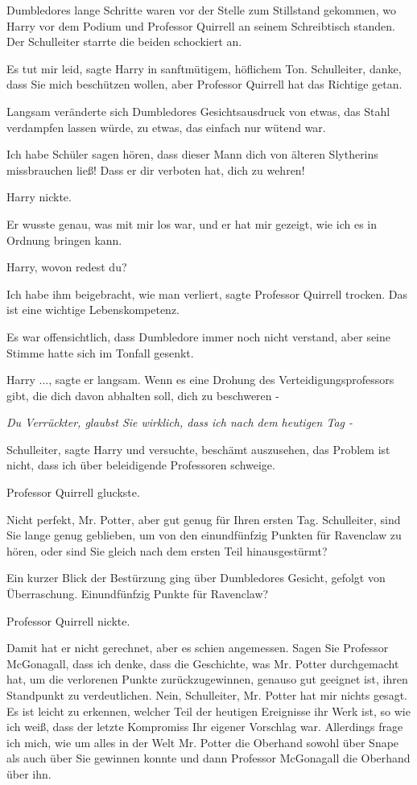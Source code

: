 Dumbledores lange Schritte waren vor der Stelle zum Stillstand gekommen, wo
Harry vor dem Podium und Professor Quirrell an seinem Schreibtisch standen. Der
Schulleiter starrte die beiden schockiert an.

\glqq Es tut mir leid\grqq{}, sagte Harry in sanftmütigem, höflichem Ton. \glqq
Schulleiter, danke, dass Sie mich beschützen wollen, aber Professor Quirrell hat
das Richtige getan.\grqq{}

Langsam veränderte sich Dumbledores Gesichtsausdruck von etwas, das Stahl
verdampfen lassen würde, zu etwas, das einfach nur wütend war.

\glqq Ich habe Schüler sagen hören, dass dieser Mann dich von älteren Slytherins
missbrauchen ließ! Dass er dir verboten hat, dich zu wehren!\grqq{}

Harry nickte.

\glqq Er wusste genau, was mit mir los war, und er hat mir gezeigt, wie ich es
in Ordnung bringen kann.\grqq{}

\glqq Harry, wovon redest du?\grqq{}

\glqq Ich habe ihm beigebracht, wie man verliert\grqq{}, sagte Professor
Quirrell trocken. \glqq Das ist eine wichtige Lebenskompetenz.\grqq{}

Es war offensichtlich, dass Dumbledore immer noch nicht verstand, aber seine
Stimme hatte sich im Tonfall gesenkt.

\glqq Harry ...\grqq{}, sagte er langsam. \glqq Wenn es eine Drohung des
Verteidigungsprofessors gibt, die dich davon abhalten soll, dich zu beschweren
-\grqq{}

\emph{Du Verrückter, glaubst Sie wirklich, dass ich nach dem heutigen Tag -}

\glqq Schulleiter\grqq{}, sagte Harry und versuchte, beschämt auszusehen, \glqq
das Problem ist nicht, dass ich über beleidigende Professoren schweige.\grqq{}

Professor Quirrell gluckste.

\glqq Nicht perfekt, Mr. Potter, aber gut genug für Ihren ersten Tag.
Schulleiter, sind Sie lange genug geblieben, um von den einundfünfzig Punkten
für Ravenclaw zu hören, oder sind Sie gleich nach dem ersten Teil
hinausgestürmt?\grqq{}

Ein kurzer Blick der Bestürzung ging über Dumbledores Gesicht, gefolgt von
Überraschung. \glqq Einundfünfzig Punkte für Ravenclaw?\grqq{}

Professor Quirrell nickte.

\glqq Damit hat er nicht gerechnet, aber es schien angemessen. Sagen Sie
Professor McGonagall, dass ich denke, dass die Geschichte, was Mr. Potter
durchgemacht hat, um die verlorenen Punkte zurückzugewinnen, genauso gut
geeignet ist, ihren Standpunkt zu verdeutlichen. Nein, Schulleiter, Mr. Potter
hat mir nichts gesagt. Es ist leicht zu erkennen, welcher Teil der heutigen
Ereignisse ihr Werk ist, so wie ich weiß, dass der letzte Kompromiss Ihr eigener
Vorschlag war. Allerdings frage ich mich, wie um alles in der Welt Mr. Potter
die Oberhand sowohl über Snape als auch über Sie gewinnen konnte und dann
Professor McGonagall die Oberhand über ihn.\grqq{}

